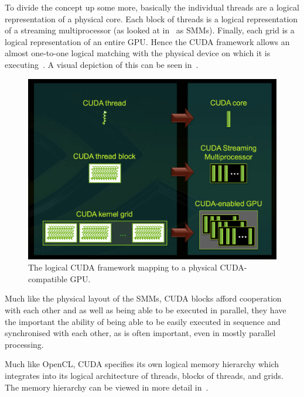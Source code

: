 \documentclass[a4paper,11pt]{article}
\begin{document}
To divide the concept up some more, basically the individual threads are a logical representation of a physical core. Each
block of threads is a logical representation of a streaming multiprocessor (as looked at in~ as SMMs).
Finally, each grid is a logical representation of an entire GPU. Hence the CUDA framework allows an almost one-to-one
logical matching with the physical device on which it is executing~\cite{slides:KhronosOpenCLOverview}. A visual depiction of this can be seen in~.

\begin{figure}[ht]
  \centering
  \includegraphics[scale=0.2]{img/cuda-mapping}
  \caption{The logical CUDA framework mapping to a physical CUDA-compatible GPU.~\cite{slides:KhronosOpenCLOverview}}
\label{fig:cuda-mapping}
\end{figure}

Much like the physical layout of the SMMs, CUDA blocks afford cooperation with each other and as well as being able to be
executed in parallel, they have the important the ability of being able to be easily executed in sequence and synchronised
with each other, as is often important, even in mostly parallel processing.

Much like OpenCL, CUDA specifies its own logical memory hierarchy which integrates into its logical architecture of
threads, blocks of threads, and grids. The memory hierarchy can be viewed in more detail in~.
\end{document}

